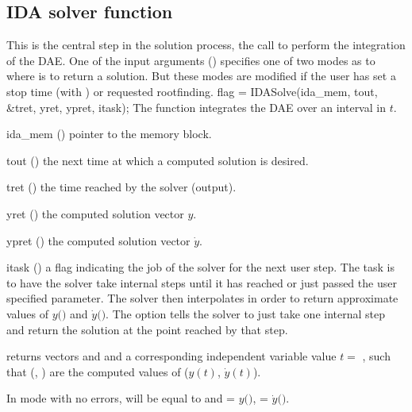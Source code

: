 {\subsection{IDA solver function}\label{sss:idasolve}
%
This is the central step in the solution process, the call to perform the
integration of the DAE.  One of the input arguments ()
specifies one of two modes as to where {\ida} is to return a solution.
But these modes are modified if the user has set a stop time (with
) or requested rootfinding.
%
{
  flag = IDASolve(ida\_mem, tout, \&tret, yret, ypret, itask);
}
{
  The function  integrates the DAE over an interval in $t$.
}
{
  \begin{args}
  \item[ida\_mem] ()
    pointer to the {\ida} memory block.
  \item[tout] ()
    the next time at which a computed solution is desired.
  \item[tret] ()
    the time reached by the solver (output).
  \item[yret] ()
    the computed solution vector $y$.
  \item[ypret] ()
    the computed solution vector $\dot{y}$.
  \item[itask] ()
    a flag indicating the job of the solver for the next user step. 
    The  task is to have the solver take internal steps until   
    it has reached or just passed the user specified 
    parameter. The solver then interpolates in order to   
    return approximate values of $y($$)$ and $\dot{y}($$)$. 
    The  option tells the solver to just take one internal step  
    and return the solution at the point reached by that step. 
  \end{args}
}
{
   returns vectors  and  and a
  corresponding independent variable value $t =$ , such that (,
  ) are the computed values of ($y(t)$, $\dot{y}(t)$).

  In  mode with no errors,  will be equal to  
  and  = $y($$)$,  = $\dot{y}($$)$.

}}
